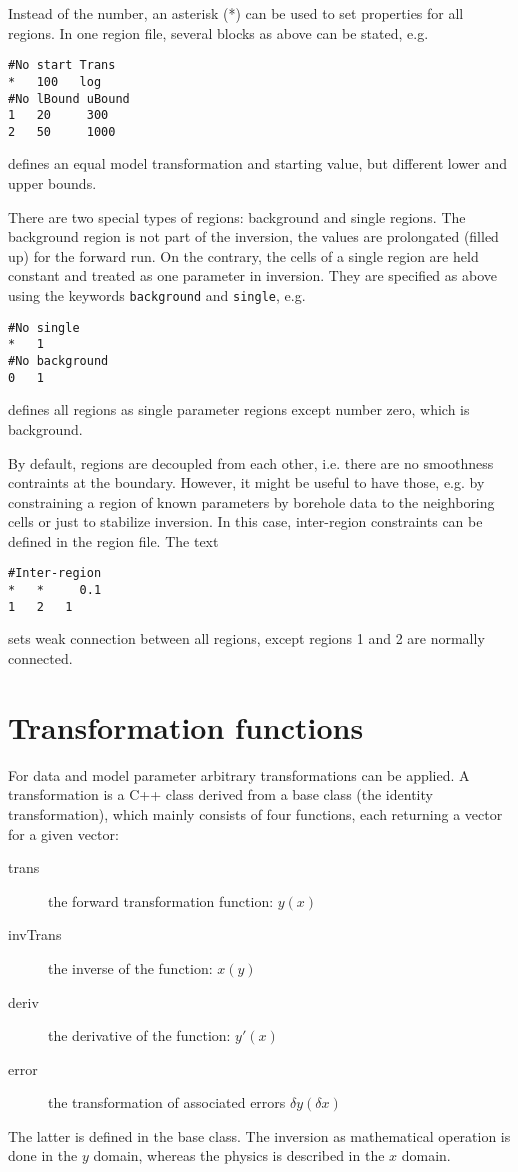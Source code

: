 Instead of the number, an asterisk (*) can be used to set properties for all regions.
In one region file, several blocks as above can be stated, e.g.
\begin{verbatim}
#No start Trans
*   100   log
#No lBound uBound
1   20     300
2   50     1000
\end{verbatim}
defines an equal model transformation and starting value, but different lower and upper bounds.

There are two special types of regions: background and single regions.
The background region is not part of the inversion, the values are prolongated (filled up) for the forward run.
On the contrary, the cells of a single region are held constant and treated as one parameter in inversion.
They are specified as above using the keywords \verb|background| and \verb|single|, e.g.
\begin{verbatim}
#No single
*	1
#No background
0	1 
\end{verbatim}
defines all regions as single parameter regions except number zero, which is background.

By default, regions are decoupled from each other, i.e. there are no smoothness contraints at the boundary.
However, it might be useful to have those, e.g. by constraining a region of known parameters by borehole data to the neighboring cells or just to stabilize inversion.
In this case, inter-region constraints can be defined in the region file. 
The text
\begin{verbatim}
#Inter-region
* 	*	  0.1
1   2   1
\end{verbatim}
sets weak connection between all regions, except regions 1 and 2 are normally connected.

\clearpage
\section{Transformation functions}\label{app:trans}
For data and model parameter arbitrary transformations can be applied.
A transformation is a C++ class derived from a base class (the identity transformation), which mainly consists of four functions, each returning a vector for a given vector:
\begin{description}
\item[trans] the forward transformation function: $y(x)$
\item[invTrans] the inverse of the function: $x(y)$
\item[deriv] the derivative of the function: $y'(x)$
\item[error] the transformation of associated errors $\delta y(\delta x)$
\end{description}
The latter is defined in the base class.
The inversion as mathematical operation is done in the $y$ domain, whereas the physics is described in the $x$ domain.

